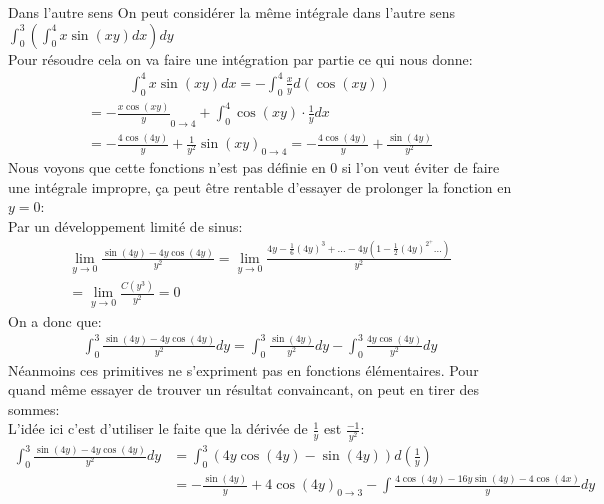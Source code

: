 \begin{parag}{Dans l'autre sens}
    On peut considérer la même intégrale  dans l'autre sens $\int_0^3\left(\int_0^4 x \sin\left(xy\right)dx\right)dy$\\
    Pour résoudre cela on va faire une intégration par partie ce qui nous donne:
    \begin{align*} 
        \int_0^4 x \sin\left(xy\right)dx =  -\int_0^4\frac{x}{y}d\left(\cos\left(xy\right)\right) 
    \end{align*}
    \begin{align*} 
        = - \frac{x\cos\left(xy\right)}{y}_{0\to 4} + \int_0^4 \cos\left(xy\right) \cdot  \frac{1}{y}dx\\
        = -\frac{4\cos\left(4y\right)}{y} + \frac{1}{y^2}\sin\left(xy\right)_{0 \to 4} = -\frac{4\cos\left(4y\right)}{y} + \frac{\sin\left(4y\right)}{y^2}
    \end{align*}
    Nous voyons que cette fonctions n'est pas définie en $0$ si l'on veut éviter de faire une intégrale impropre, ça peut être rentable d'essayer de prolonger la fonction en $y = 0$:\\
    Par un développement limité de sinus:
    \begin{align*} 
        \lim_{y  \to 0} \frac{\sin\left(4y\right) - 4y\cos\left(4y\right)}{y^2} =  \lim_{y \to 0} \frac{4y - \frac{1}{6}\left(4y\right)^3 + \ldots - 4y\left(1 - \frac{1}{2}\left(4y\right)^2^+ \ldots \right)}{y^2} \\
        = \lim_{y \to 0} \frac{C\left(y^3\right)}{y^2} =  0
    \end{align*}
    On a donc que:
    \begin{align*} 
        \int_0^3 \frac{\sin\left(4y\right) - 4y\cos\left(4y\right)}{y^2}dy = \int_0^3 \frac{\sin\left(4y\right)}{y^2}dy - \int_0^3 \frac{4y\cos\left(4y\right)}{y^2} dy
    \end{align*}
    Néanmoins ces primitives ne s'expriment pas en fonctions élémentaires. Pour quand même essayer de trouver un résultat convaincant, on peut en tirer des sommes:\\
L'idée ici c'est d'utiliser le faite que la dérivée de $\frac{1}{y}$ est $\frac{-1}{y^2}$:
    \begin{align*} 
        \int_0^3 \frac{\sin\left(4y\right)-4y\cos\left(4y\right)}{y^2} dy &= \int_0^3\left(4y\cos\left(4y\right)-\sin\left(4y\right)\right)d\left(\frac{1}{y}\right)\\
            &= -\frac{\sin\left(4y\right)}{y} + 4\cos\left(4y\right)_{0 \to 3} - \int \frac{4\cos\left(4y\right) - 16y\sin\left(4y\right) - 4\cos\left(4x\right)}{y} dy\\

\end{align*}
\end{parag}
